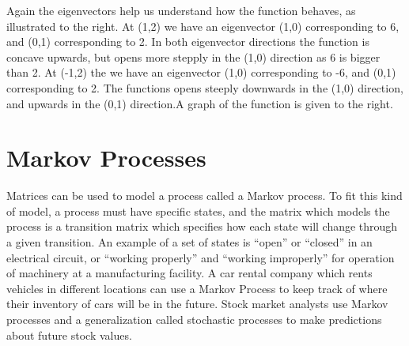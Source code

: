 \begin{example}
Again the eigenvectors help us understand how the function behaves, as illustrated to the right.  At (1,2) we have an eigenvector (1,0) corresponding to 6, and (0,1) corresponding to 2. In both eigenvector directions the function is concave upwards, but opens more stepply in the (1,0) direction as 6 is bigger than 2.  At (-1,2) the we have an eigenvector (1,0) corresponding to -6, and (0,1) corresponding to 2. The functions opens steeply downwards in the (1,0) direction, and upwards in the (0,1) direction.A graph of the function is given to the right.
\end{example}















\section{Markov Processes}

Matrices can be used to model a process called a Markov process. To fit this kind of model, a process must have specific states, and the matrix which models the process is a transition matrix which specifies how each state will change through a given transition. An example of a set of states is ``open'' or ``closed'' in an electrical circuit, or ``working properly'' and ``working improperly'' for operation of machinery at a manufacturing facility. A car rental company which rents vehicles in different locations can use a Markov Process to keep track of where their inventory of cars will be in the future. Stock market analysts use Markov processes and a generalization called stochastic processes to make predictions about future stock values.

